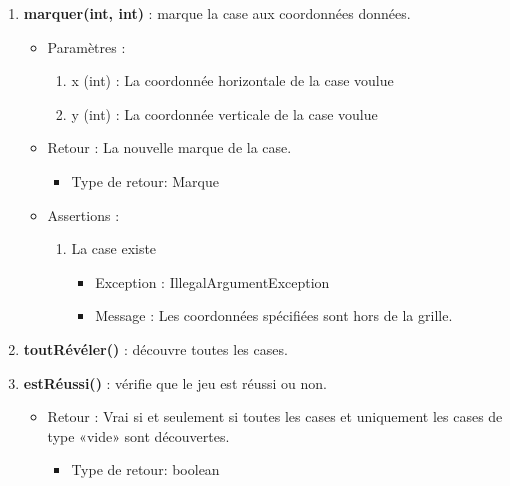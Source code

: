 \begin{itemize}
\begin{enumerate}
    \item {\bf marquer(int, int) }: marque la case aux coordonnées données.
      \begin{itemize}
      \item Paramètres : 
        \begin{enumerate}
        \item x (int) : La coordonnée horizontale de la case voulue
        \item y (int) : La coordonnée verticale de la case voulue          
        \end{enumerate}
      \item Retour : La nouvelle marque de la case.
          \begin{itemize}
          \item Type de retour: Marque
          \end{itemize}
      \item Assertions : 
        \begin{enumerate}
        \item La case existe
          \begin{itemize}
            \item Exception : IllegalArgumentException
          \item Message : Les coordonnées spécifiées sont hors de la grille.
          \end{itemize}
        \end{enumerate}
      \end{itemize}
      
    \item {\bf toutRévéler() }: découvre toutes les cases.
      
    \item {\bf estRéussi() }: vérifie que le jeu est réussi ou non.
      \begin{itemize}
      \item Retour : Vrai si et seulement si toutes les cases et uniquement les cases de type «vide» sont découvertes.
          \begin{itemize}
          \item Type de retour: boolean
          \end{itemize}
      \end{itemize}
      
    \end{enumerate}

  \end{itemize}
